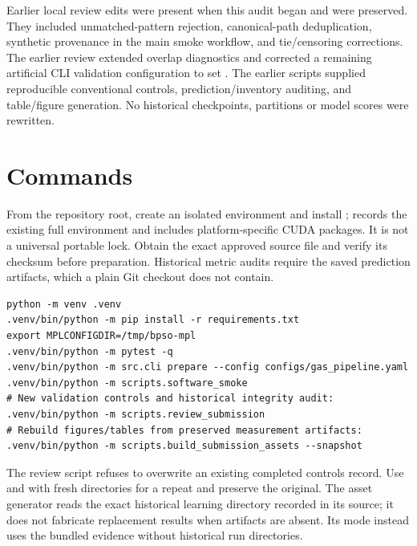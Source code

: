\documentclass[11pt,a4paper]{report}
\begin{document}
Earlier local review edits were present when this audit began and were preserved. They included unmatched-pattern rejection, canonical-path deduplication, synthetic provenance in the main smoke workflow, and tie/censoring corrections. The earlier review extended overlap diagnostics and corrected a remaining artificial CLI validation configuration to set . The earlier scripts supplied reproducible conventional controls, prediction/inventory auditing, and table/figure generation. No historical checkpoints, partitions or model scores were rewritten.

\section{Commands}
From the repository root, create an isolated environment and install ;  records the existing full environment and includes platform-specific CUDA packages. It is not a universal portable lock. Obtain the exact approved source file and verify its checksum before preparation. Historical metric audits require the saved prediction artifacts, which a plain Git checkout does not contain.
\begin{lstlisting}
python -m venv .venv
.venv/bin/python -m pip install -r requirements.txt
export MPLCONFIGDIR=/tmp/bpso-mpl
.venv/bin/python -m pytest -q
.venv/bin/python -m src.cli prepare --config configs/gas_pipeline.yaml
.venv/bin/python -m scripts.software_smoke
# New validation controls and historical integrity audit:
.venv/bin/python -m scripts.review_submission
# Rebuild figures/tables from preserved measurement artifacts:
.venv/bin/python -m scripts.build_submission_assets --snapshot
\end{lstlisting}
The review script refuses to overwrite an existing completed controls record. Use  and  with fresh directories for a repeat and preserve the original. The asset generator reads the exact historical learning directory recorded in its source; it does not fabricate replacement results when artifacts are absent. Its  mode instead uses the bundled evidence without historical run directories.
\end{document}
